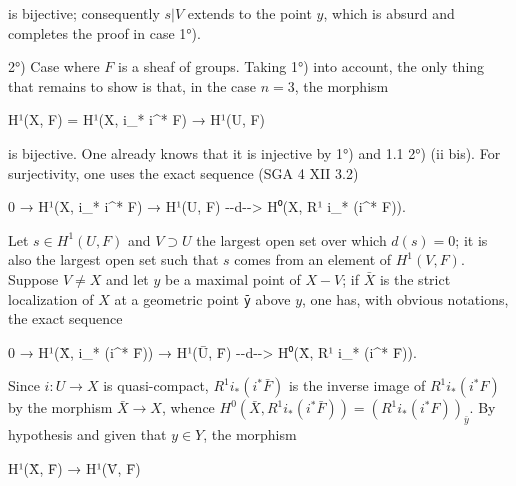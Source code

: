 \documentclass[
]{article}
\newenvironment{Shaded}{}{}
\newcommand{\NormalTok}[1]{#1}
\begin{document}
is bijective; consequently \(s|V\) extends to the point \(y\), which is
absurd and completes the proof in case 1°).

2°) Case where \(F\) is a sheaf of groups. Taking 1°) into account, the
only thing that remains to show is that, in the case \(n = 3\), the
morphism

\begin{Shaded}
\begin{Highlighting}[]
\NormalTok{H¹(X, F) = H¹(X, i\_* i\^{}* F) → H¹(U, F)}
\end{Highlighting}
\end{Shaded}

is bijective. One already knows that it is injective by 1°) and 1.1 2°)
(ii bis). For surjectivity, one uses the exact sequence (SGA 4 XII 3.2)

\begin{Shaded}
\begin{Highlighting}[]
\NormalTok{0 → H¹(X, i\_* i\^{}* F) → H¹(U, F) {-}{-}d{-}{-}\textgreater{} H⁰(X, R¹ i\_* (i\^{}* F)).}
\end{Highlighting}
\end{Shaded}

Let \(s \in H^{1}(U, F)\) and \(V \supset U\) the largest open set over
which \(d(s) = 0\); it is also the largest open set such that \(s\)
comes from an element of \(H^{1}(V, F)\). Suppose \(V \neq X\) and let
\(y\) be a maximal point of \(X - V\); if \(\bar{X}\) is the strict
localization of \(X\) at a geometric point \texttt{ȳ} above \(y\), one
has, with obvious notations, the exact sequence

\begin{Shaded}
\begin{Highlighting}[]
\NormalTok{0 → H¹(X̄, i\_* (i\^{}* F̄)) → H¹(Ū, F̄) {-}{-}d{-}{-}\textgreater{} H⁰(X̄, R¹ i\_* (i\^{}* F̄)).}
\end{Highlighting}
\end{Shaded}

Since \(i : U \to X\) is quasi-compact, \(R^{1} i_{*} (i^{*} \bar{F})\)
is the inverse image of \(R^{1} i_{*} (i^{*} F)\) by the morphism
\(\bar{X} \to X\), whence
\(H^{0}(\bar{X}, R^{1} i_{*} (i^{*} \bar{F})) = (R^{1} i_{*} (i^{*} F))_{\bar{y}}\).
By hypothesis and given that \(y \in Y\), the morphism

\begin{Shaded}
\begin{Highlighting}[]
\NormalTok{H¹(X̄, F̄) → H¹(V̄, F̄)}
\end{Highlighting}
\end{Shaded}
\end{document}
